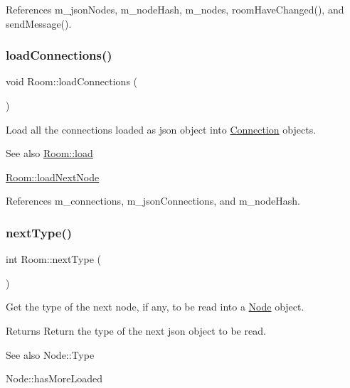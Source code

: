 References m\+\_\+json\+Nodes, m\+\_\+node\+Hash, m\+\_\+nodes, room\+Have\+Changed(), and send\+Message().

\mbox{\label{classRoom_a55b3be4272343997434bd5f690ba954e}} 
\subsubsection{\texorpdfstring{load\+Connections()}{loadConnections()}}
{\footnotesize\ttfamily void Room\+::load\+Connections (\begin{DoxyParamCaption}{ }\end{DoxyParamCaption})}



Load all the connections loaded as json object into \mbox{\hyperlink{classConnection}{Connection}} objects. 

\begin{DoxySeeAlso}{See also}
\mbox{\hyperlink{classRoom_a26065830b40a3a127ee2686d9feb4b74}{Room\+::load}} 

\mbox{\hyperlink{classRoom_ab1f1a0f0b4db3483b0f09667d81f2d61}{Room\+::load\+Next\+Node}} 
\end{DoxySeeAlso}


References m\+\_\+connections, m\+\_\+json\+Connections, and m\+\_\+node\+Hash.

\mbox{\label{classRoom_a20e9c4082ae977586a53f4f909869592}} 
\subsubsection{\texorpdfstring{next\+Type()}{nextType()}}
{\footnotesize\ttfamily int Room\+::next\+Type (\begin{DoxyParamCaption}{ }\end{DoxyParamCaption})}



Get the type of the next node, if any, to be read into a \mbox{\hyperlink{classNode}{Node}} object. 

\begin{DoxyReturn}{Returns}
Return the type of the next json object to be read. 
\end{DoxyReturn}
\begin{DoxySeeAlso}{See also}
Node\+::\+Type 

Node\+::has\+More\+Loaded 
\end{DoxySeeAlso}



